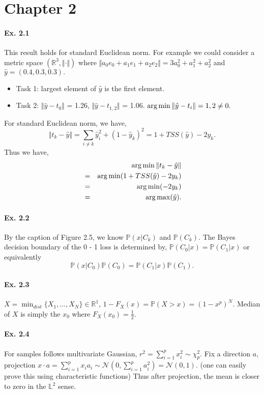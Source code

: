 \section*{Chapter 2}
\paragraph*{Ex. 2.1}
This result holds for standard Euclidean norm. For example we could consider a metric space $(\mathbb{R}^3, \Vert\cdot\Vert)$ where
$\Vert a_0 e_0 + a_1 e_1 + a_2 e_2\Vert= 3 a_0^2 + a_1^2 + a_2^2$ and $\hat{y} = (0.4, 0.3, 0.3).$
\begin{itemize}
	\item Task 1: largest element of $\hat{y}$ is the first element.
	\item Task 2: $\Vert \hat{y} - t_0 \Vert $ = 1.26, $\Vert \hat{y} - t_{1, 2} \Vert $ = 1.06. $\operatorname*{arg\,min} \Vert \hat{y} - t_{i} \Vert = 1, 2 \neq 0.$
\end{itemize}
For standard Euclidean norm, we have,
$$\Vert t_k - \hat{y}\Vert =  \sum_{i\neq k}\hat{y}^2_i + (1 - \hat{y}_{k})^2 = 1 + TSS(\hat{y}) - 2y_{k}.$$
Thus we have,
\begin{eqnarray*}
	& & \operatorname*{arg\,min}\Vert t_k - \hat{y}\Vert \\
	&=& \operatorname*{arg\,min}(1 + TSS(\hat{y}) - 2y_{k}) \\
	&=& \operatorname*{arg\,min}(- 2y_{k}) \\
	&=& \operatorname*{arg\,max}(\hat{y}).
\end{eqnarray*}

\paragraph*{Ex. 2.2}
By the caption of Figure 2.5, we know $\mathbb{P}(x | C_{k})$ and $\mathbb{P}(C_{k})$. The  Bayes decision boundary of the 0 - 1 loss is determined by, $\mathbb{P}(C_{0} | x) = \mathbb{P}(C_{1} | x)$ or equivalently
$$\mathbb{P}(x | C_{0})\mathbb{P}(C_{0}) = \mathbb{P}(C_{1} | x) \mathbb{P}(C_{1}).$$

\paragraph*{Ex. 2.3}
$X = \min_{dist} \{X_1,...,X_N\} \in \mathbb{R}^1$, $1 - F_X(x) = \mathbb{P}(X > x) = (1 - x^p)^N.$ Median of $X$ is simply the $x_0$ where $F_X(x_0) = \frac{1}{2}.$

\paragraph*{Ex. 2.4}
For samples follows multivariate Gaussian, $r^2 = \sum_{i=1}^{p} x_i^2 \sim \chi^2_{p}.$ Fix a direction $a$, projection $x \cdot a = \sum_{i=1}^{p} x_i a_i \sim \mathcal{N}(0, \sum_{i=1}^{p}a_{i}^2) = \mathcal{N}(0, 1).$ (one can easily prove this using characteristic functions) Thus after projection, the mean is closer to zero in the $\mathbb{L}^2$ sense.

